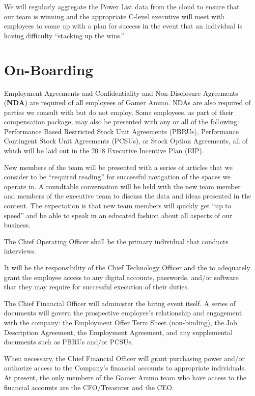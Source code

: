 \documentclass[11pt]{report}
\begin{document}
We will regularly aggregate the Power List data from the cloud to ensure that our team is winning and the appropriate C-level executive will meet with employees to come up with a plan for success in the event that an individual is having difficulty ``stacking up the wins.''

\section{On-Boarding}
Employment Agreements and Confidentiality and Non-Disclosure Agreements (\textbf{NDA}) are required of all employees of Gamer Ammo. NDAs are also required of parties we consult with but do not employ. Some employees, as part of their compensation package, may also be presented with any or all of the following: Performance Based Restricted Stock Unit Agreements (PBRUs), Performance Contingent Stock Unit Agreements (PCSUs), or Stock Option Agreements, all of which will be laid out in the 2018 Executive Incentive Plan (EIP).

New members of the team will be presented with a series of articles that we consider to be ``required reading''\cite{crypto-canon} for successful navigation of the spaces we operate in. A roundtable conversation will be held with the new team member and members of the executive team to discuss the data and ideas presented in the content. The expectation is that new team members will quickly get ``up to speed'' and be able to speak in an educated fashion about all aspects of our business.

The Chief Operating Officer shall be the primary individual that conducts interviews.

It will be the responsibility of the Chief Technology Officer and the to adequately grant the employee access to any digital accounts, passwords, and/or software that they may require for successful execution of their duties.

The Chief Financial Officer will administer the hiring event itself. A series of documents will govern the prospective employee's relationship and engagement with the company: the Employment Offer Term Sheet (non-binding), the Job Description Agreement, the Employment Agreement, and any supplemental documents such as PBRUs and/or PCSUs.

When necessary, the Chief Financial Officer will grant purchasing power and/or authorize access to the Company's financial accounts to appropriate individuals. At present, the only members of the Gamer Ammo team who have access to the financial accounts are the CFO/Treasurer and the CEO.
\end{document}
